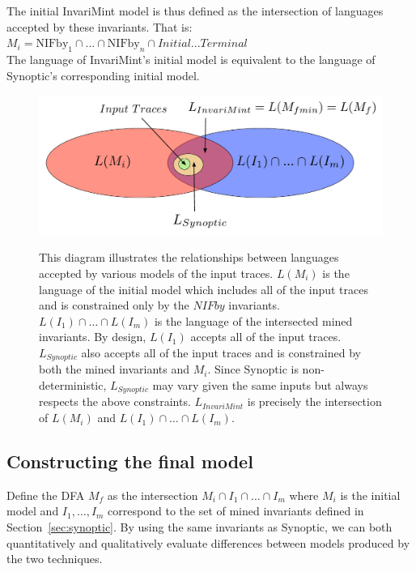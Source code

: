 The initial InvariMint model is thus defined as the
intersection of languages accepted by these invariants. That is:\\

$M_i = \textrm{NIFby}_1 \cap ... \cap \textrm{NIFby}_n \cap
\textrm{$Initial...Terminal$}$\\

The language of InvariMint's initial model is equivalent to the language of
Synoptic's corresponding initial model.

\begin{figure}[t!]
   \center
   {\includegraphics[width=0.95\columnwidth]{fig/language-venn.pdf}}
   \caption{This diagram illustrates the relationships between languages
    accepted by various models of the input traces. $L(M_i)$ is the language of
    the initial model which includes all of the input traces and is constrained
    only by the $NIFby$ invariants.
    $L(I_1) \cap \ldots \cap L(I_m)$ is the language of the intersected mined
    invariants. By design, $L(I_1)$ accepts all of the input traces.
    $L_{Synoptic}$ also accepts all of the input traces and is constrained by
    both the mined invariants and $M_i$. 
    Since Synoptic is non-deterministic, $L_{Synoptic}$ may vary given the same
    inputs but always respects the above constraints.
    $L_{InvariMint}$ is precisely the intersection of $L(M_i)$ and $L(I_1) \cap
    \ldots \cap L(I_m)$.
   } 
   \label{fig:language-venn}
\end{figure}


\subsection{Constructing the final model}
Define the DFA $M_f$ as the intersection $M_i \cap I_1 \cap \ldots
\cap I_m$ where $M_i$ is the initial model and $I_1, \ldots, I_m$
correspond to the set of mined
invariants defined in Section~\ref{sec:synoptic}.
By using the same invariants as Synoptic, we can both quantitatively and qualitatively
evaluate differences between models produced by the two techniques.


